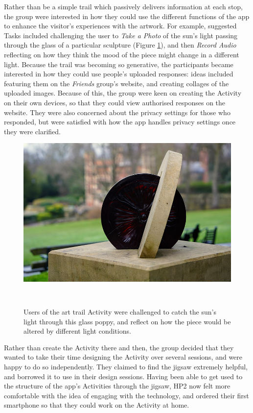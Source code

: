 Rather than be a simple trail which passively delivers information at each stop, the group were interested in how they could use the different functions of the app to enhance the visitor's experiences with the artwork. For example, suggested Tasks included challenging the user to \textit{Take a Photo} of the sun's light passing through the glass of a particular sculpture (Figure \ref{fig:ParkArt}), and then \textit{Record Audio} reflecting on how they think the mood of the piece might change in a different light. Because the trail was becoming so generative, the participants became interested in how they could use people's uploaded responses: ideas included featuring them on the \textit{Friends} group's website, and creating collages of the uploaded images. Because of this, the group were keen on creating the Activity on their own devices, so that they could view authorised responses on the website. They were also concerned about the privacy settings for those who responded, but were satisfied with how the app handles privacy settings once they were clarified.

\begin{figure}
  \centering
  \includegraphics[width=0.75\columnwidth]{images/chapter06/artpiece.jpg}
  \caption[An art piece which was used in an OurPlace Task]{Users of the art trail Activity were challenged to catch the sun's light through this glass poppy, and reflect on how the piece would be altered by different light conditions.}~\label{fig:ParkArt}
\end{figure}

Rather than create the Activity there and then, the group decided that they wanted to take their time designing the Activity over several sessions, and were happy to do so independently. They claimed to find the jigsaw extremely helpful, and borrowed it to use in their design sessions. Having been able to get used to the structure of the app's Activities through the jigsaw, HP2 now felt more comfortable with the idea of engaging with the technology, and ordered their first smartphone so that they could work on the Activity at home.

